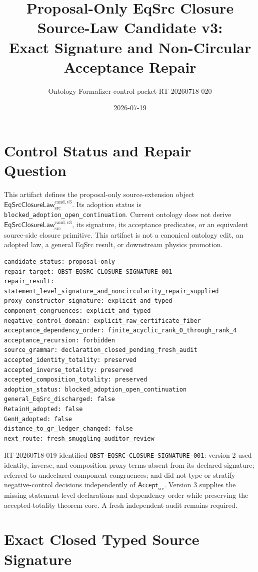 \documentclass[11pt]{article}
\title{Proposal-Only EqSrc Closure Source-Law Candidate v3:\\
Exact Signature and Non-Circular Acceptance Repair}
\author{Ontology Formalizer control packet RT-20260718-020}
\date{2026-07-19}
\newcommand{\Accept}{\mathsf{Accept}_{\mathrm{src}}}
\newcommand{\Law}{\mathsf{EqSrcClosureLaw}^{\mathrm{cand},v3}_{\mathrm{src}}}
\begin{document}
\maketitle

\section{Control Status and Repair Question}

This artifact defines the proposal-only source-extension object \(\Law\).
Its adoption status is
\texttt{blocked\_adoption\_open\_continuation}. Current ontology does not
derive \(\Law\), its signature, its acceptance predicates, or an equivalent
source-side closure primitive. This artifact is not a canonical ontology edit,
an adopted law, a general EqSrc result, or downstream physics promotion.

\begin{verbatim}
candidate_status: proposal-only
repair_target: OBST-EQSRC-CLOSURE-SIGNATURE-001
repair_result: statement_level_signature_and_noncircularity_repair_supplied
proxy_constructor_signature: explicit_and_typed
component_congruences: explicit_and_typed
negative_control_domain: explicit_raw_certificate_fiber
acceptance_dependency_order: finite_acyclic_rank_0_through_rank_4
acceptance_recursion: forbidden
source_grammar: declaration_closed_pending_fresh_audit
accepted_identity_totality: preserved
accepted_inverse_totality: preserved
accepted_composition_totality: preserved
adoption_status: blocked_adoption_open_continuation
general_EqSrc_discharged: false
RetainH_adopted: false
GenH_adopted: false
distance_to_gr_ledger_changed: false
next_route: fresh_smuggling_auditor_review
\end{verbatim}

RT-20260718-019 identified
\texttt{OBST-EQSRC-CLOSURE-SIGNATURE-001}: version 2 used identity, inverse,
and composition proxy terms absent from its declared signature; referred to
undeclared component congruences; and did not type or stratify negative-control
decisions independently of \(\Accept\). Version 3 supplies the missing
statement-level declarations and dependency order while preserving the
accepted-totality theorem core. A fresh independent audit remains required.

\section{Exact Closed Typed Source Signature}
\end{document}
